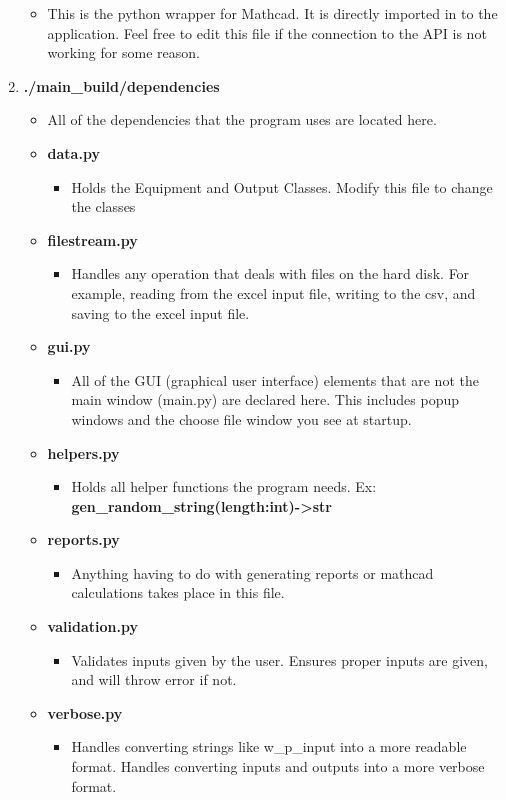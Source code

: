 \documentclass[11pt]{article}
\begin{document}
\begin{enumerate}
\begin{itemize}
\item This is the python wrapper for Mathcad. It is directly imported in to the application. Feel free to edit this file if the connection to the API is not working for some reason.
\end{itemize}
\item \textbf{./main\_build/dependencies}
\begin{itemize}
\item All of the dependencies that the program uses are located here.
\item \textbf{data.py}
\begin{itemize}
\item Holds the Equipment and Output Classes. Modify this file to change the classes
\end{itemize}
\item \textbf{filestream.py}
\begin{itemize}
\item Handles any operation that deals with files on the hard disk. For example, reading from the excel input file, writing to the csv, and saving to the excel input file.
\end{itemize}
\item \textbf{gui.py}
\begin{itemize}
\item All of the GUI (graphical user interface) elements that are not the main window (main.py) are declared here. This includes popup windows and the choose file window you see at startup.
\end{itemize}
\item \textbf{helpers.py}
\begin{itemize}
\item Holds all helper functions the program needs. Ex: \textbf{gen\_random\_string(length:int)->str}
\end{itemize}
\item \textbf{reports.py}
\begin{itemize}
\item Anything having to do with generating reports or mathcad calculations takes place in this file.
\end{itemize}
\item \textbf{validation.py}
\begin{itemize}
\item Validates inputs given by the user. Ensures proper inputs are given, and will throw error if not.
\end{itemize}
\item \textbf{verbose.py}
\begin{itemize}
\item Handles converting strings like w\_p\_input into a more readable format. Handles converting inputs and outputs into a more verbose format.
\end{itemize}
\end{itemize}
\end{enumerate}
\end{document}
